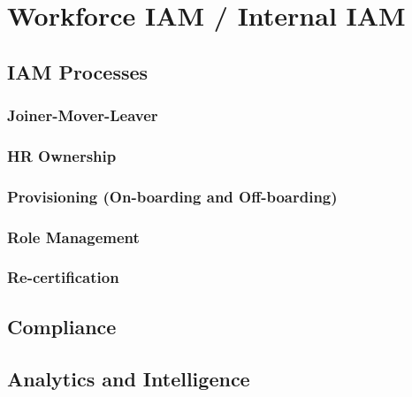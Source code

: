 \hypertarget{workforce-iam-internal-iam}{%
\chapter{Workforce IAM / Internal
IAM}\label{workforce-iam-internal-iam}}

\hypertarget{iam-processes}{%
\section{IAM Processes}\label{iam-processes}}

\hypertarget{joiner-mover-leaver}{%
\subsection{Joiner-Mover-Leaver}\label{joiner-mover-leaver}}

\hypertarget{hr-ownership}{%
\subsection{HR Ownership}\label{hr-ownership}}

\hypertarget{provisioning-on-boarding-and-off-boarding}{%
\subsection{Provisioning (On-boarding and
Off-boarding)}\label{provisioning-on-boarding-and-off-boarding}}

\hypertarget{role-management}{%
\subsection{Role Management}\label{role-management}}

\hypertarget{re-certification}{%
\subsection{Re-certification}\label{re-certification}}

\hypertarget{compliance}{%
\section{Compliance}\label{compliance}}

\hypertarget{analytics-and-intelligence}{%
\section{Analytics and
Intelligence}\label{analytics-and-intelligence}}

